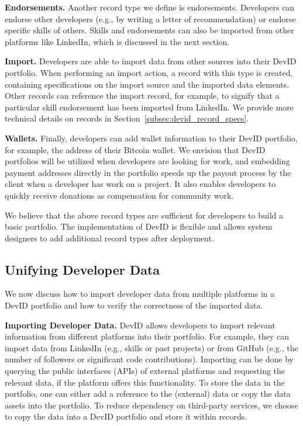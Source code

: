 \textbf{Endorsements.}
Another record type we define is endorsements.
Developers can endorse other developers (e.g., by writing a letter of recommendation) or endorse specific skills of others.
Skills and endorsements can also be imported from other platforms like LinkedIn, which is discussed in the next section.

\textbf{Import.}
Developers are able to import data from other sources into their DevID portfolio.
When performing an import action, a record with this type is created, containing specifications on the import source and the imported data elements.
Other records can reference the import record, for example, to signify that a particular skill endorsement has been imported from LinkedIn.
We provide more technical details on records in Section~\ref{subsec:devid_record_specs}.

\textbf{Wallets.}
Finally, developers can add wallet information to their DevID portfolio, for example, the address of their Bitcoin wallet.
We envision that DevID portfolios will be utilized when developers are looking for work, and embedding payment addresses directly in the portfolio speeds up the payout process by the client when a developer has work on a project.
It also enables developers to quickly receive donations as compensation for community work.

We believe that the above record types are sufficient for developers to build a basic portfolio.
The implementation of DevID is flexible and allows system designers to add additional record types after deployment.

\subsection{Unifying Developer Data}
\label{subsec:unifying_data}
We now discuss how to import developer data from multiple platforms in a DevID portfolio and how to verify the correctness of the imported data.

\textbf{Importing Developer Data.}
DevID allows developers to import relevant information from different platforms into their portfolio.
For example, they can import data from LinkedIn (e.g., skills or past projects) or from GitHub (e.g., the number of followers or significant code contributions).
Importing can be done by querying the public interfaces (APIs) of external platforms and requesting the relevant data, if the platform offers this functionality.
To store the data in the portfolio, one can either add a reference to the (external) data or copy the data assets into the portfolio.
To reduce dependency on third-party services, we choose to copy the data into a DevID portfolio and store it within records.


